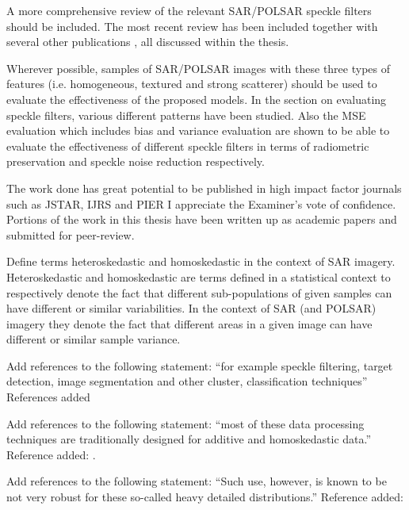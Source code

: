 \replyToComment
    {A more comprehensive review of the relevant SAR/POLSAR speckle filters should be included.}
    {The most recent review \cite{Argenti_GRSM_2013} has been included together with several other publications \cite{Lee_RSReviews_1994, Cetin_ProcSPIE_2000, White_ProcSPIE_1994, Sattar_TIP_1997, Wang_TIP_2004, Nielsen_2012_ICASSP}, all discussed within the thesis.}

\replyToComment
    {Wherever possible, samples of SAR/POLSAR images with these three types of features (i.e. homogeneous, textured and strong scatterer) should be used to evaluate the effectiveness of the proposed models.}
    {In the section on evaluating speckle filters, various different patterns have been studied. Also the MSE evaluation which includes bias and variance evaluation are shown to be able to evaluate the effectiveness of different speckle filters in terms of radiometric preservation and speckle noise reduction respectively.}
    
\replyToComment
    {The work done has great potential to be published in high impact factor journals such as JSTAR, IJRS and PIER}
    {I appreciate the Examiner's vote of confidence. Portions of the work in this thesis have been written up as academic papers and submitted for peer-review.}    

\replyToComment
    {Define terms heteroskedastic and homoskedastic in the context of SAR imagery.}
    {Heteroskedastic and homoskedastic are terms defined in a statistical context to respectively denote the fact that different sub-populations of given samples can have different or similar variabilities. In the context of SAR (and POLSAR) imagery they denote the fact that different areas in a given image can have different or similar sample variance.}  

\replyToComment
    {Add references to the following statement: ``for example speckle filtering, target detection, image segmentation and other cluster, classification techniques''}
    {References added \cite{Lopez-Martinez_2003_TGRS_2232, Alberga_2008_IJRS_4129, Conradsen_2003_TGRS_4}}

\replyToComment
    {Add references to the following statement: ``most of these data processing techniques are traditionally designed for additive and homoskedastic data.''}
    {Reference added: \cite{Dutch_LNCS_2004}.}

\replyToComment
    {Add references to the following statement: ``Such use, however, is known to be not very robust for these so-called heavy detailed distributions.''}
    {Reference added: \cite{McElroy_Econometric_2002}}
    
